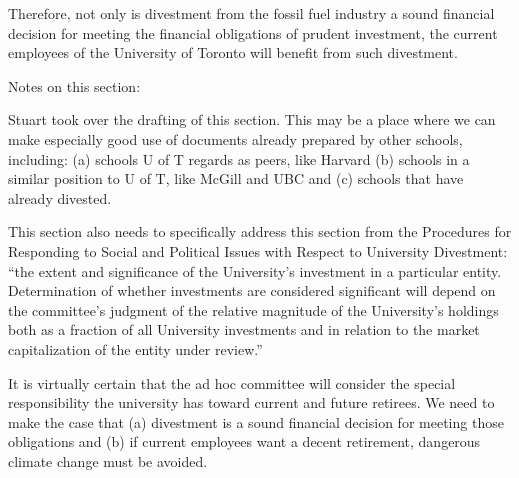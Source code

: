 Therefore, not only is divestment from the fossil fuel industry a sound financial decision for meeting the financial obligations of prudent investment, the current employees of the University of Toronto will benefit from such divestment.

\begin{vcom}
  Notes on this section:

  Stuart took over the drafting of this section. This may be a place where we can make especially good use of documents already prepared by other schools, including: (a) schools U of T regards as peers, like Harvard (b) schools in a similar position to U of T, like McGill and UBC and (c) schools that have already divested.
  
  This section also needs to specifically address this section from the Procedures for Responding to Social and Political Issues with Respect to University Divestment: ``the extent and significance of the University’s investment in a particular entity.  Determination of whether investments are considered significant will depend on the committee's judgment of the relative magnitude of the University’s holdings both as a fraction of all University investments and in relation to the market capitalization of the entity under review.''
  
  It is virtually certain that the ad hoc committee will consider the special responsibility the university has toward current and future retirees. We need to make the case that (a) divestment is a sound financial decision for meeting those obligations and (b) if current employees want a decent retirement, dangerous climate change must be avoided.
\end{vcom}




